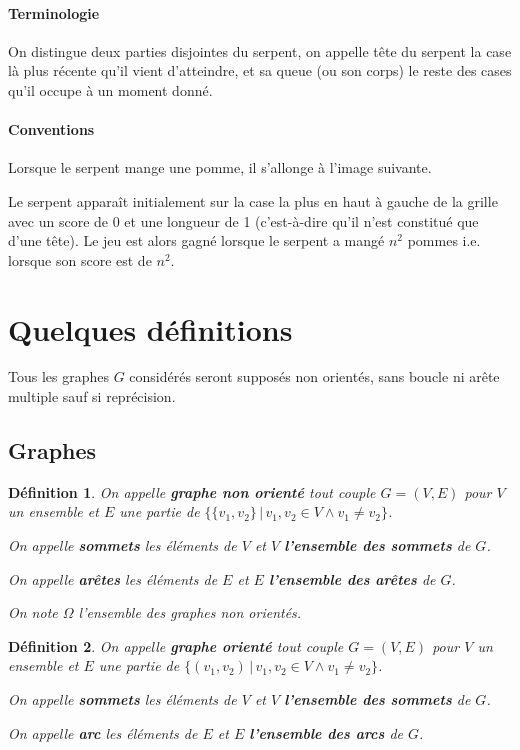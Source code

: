 \documentclass[french,a4paper]{article}
\newtheorem{definition}{Définition}[section]
\begin{document}
\paragraph{Terminologie}
On distingue deux parties disjointes du serpent, on appelle tête du serpent la case là plus récente qu'il vient d'atteindre, et sa queue (ou son corps) le reste des cases qu'il occupe à un moment donné.

\paragraph{Conventions}
Lorsque le serpent mange une pomme, il s'allonge à l'image suivante.

Le serpent apparaît initialement sur la case la plus en haut à gauche de la grille avec un score de 0 et une longueur de 1 (c'est-à-dire qu'il n'est constitué que d'une tête). Le jeu est alors gagné lorsque le serpent a mangé $n^2$ pommes i.e. lorsque son score est de $n^2$.

\section{Quelques définitions}

Tous les graphes $G$ considérés seront supposés non orientés, sans boucle ni arête multiple sauf si reprécision.

\subsection{Graphes}
\begin{definition}
On appelle \textbf{graphe non orienté} tout couple $G=(V,E)$ pour $V$ un ensemble et $E$ une partie de $\{\{v_1,v_2\} \, | \, v_1,v_2 \in V \land v_1 \neq v_2\}$.


On appelle \textbf{sommets} les éléments de $V$ et $V$ \textbf{l'ensemble des sommets} de $G$.

On appelle \textbf{arêtes} les éléments de $E$ et $E$ \textbf{l'ensemble des arêtes} de $G$.

On note $\Omega$ l'ensemble des graphes non orientés.
\end{definition}


\begin{definition}
On appelle \textbf{graphe orienté} tout couple $G=(V,E)$ pour $V$ un ensemble et $E$ une partie de $\{(v_1,v_2) \, | \, v_1,v_2 \in V \land v_1 \neq v_2\}$.

On appelle \textbf{sommets} les éléments de $V$ et $V$ \textbf{l'ensemble des sommets} de $G$.

On appelle \textbf{arc} les éléments de $E$ et $E$ \textbf{l'ensemble des arcs} de $G$.
\end{definition}
\end{document}

